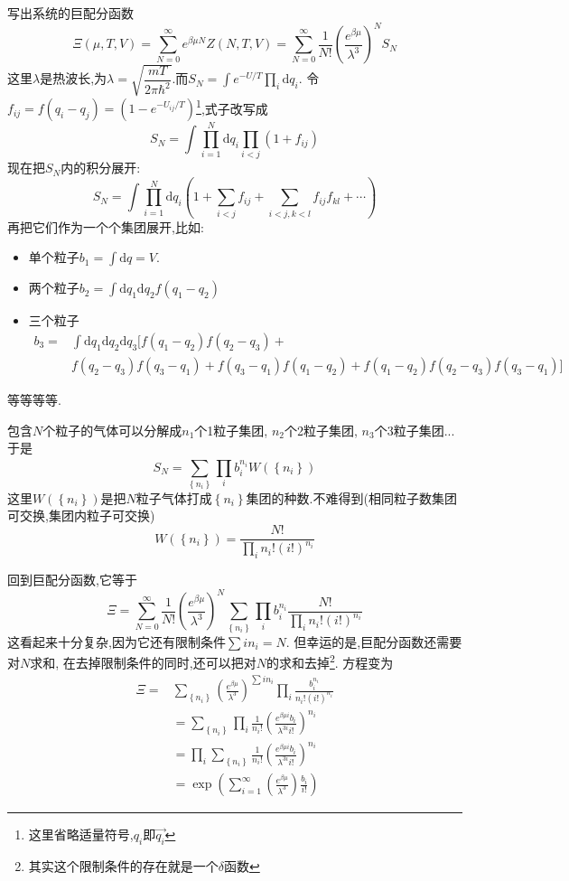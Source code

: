   写出系统的巨配分函数
  \begin{equation}
    \Xi (\mu,T,V)=\sum_{N=0}^{\infty} e^{\beta \mu N} Z(N,T,V)=\sum_{N=0}^{\infty} \frac{1}{N!} \left( \frac{e^{\beta\mu}}{\lambda^{3}} \right) ^{N} S_{N}
  \end{equation}
  这里$\lambda$是热波长,为$\lambda=\sqrt{\dfrac{mT}{2 \pi \hbar^{2}}}$.而$S_{N}=\int e^{-U /T}  \prod_{i}^{ } \mathrm{d}q_{i}$. 令 $f_{ij}= f(q_i -q_{j})=(1-e ^{- U_{ij} /T})$\footnote{这里省略适量符号,$q_{i}$即$\vec{q_{i}}$},式子改写成
  \[S_{N}=\int \prod_{i=1}^{N} \mathrm{d}  q_i  \prod_{i<j}^{} (1+f_{ij})\]
  现在把$S_{N}$内的积分展开:
  \[S_{N}=\int \prod_{i=1}^{N} \mathrm{d}  q_{i} \left( 1+ \sum_{i<j} f_{ij} +\sum_{i<j,k<l} f_{ij}f_{kl}+ \cdots  \right) \]
  再把它们作为一个个集团展开,比如:
  \begin{itemize}
      \item 单个粒子$b_1=\int \mathrm{d} q =V$.
      \item 两个粒子$b_2=\int \mathrm{d} q_1 \mathrm{d} q_2 f(q_1-q_2)$
      \item 三个粒子
        \begin{align*}
         b_3=&\int \mathrm{d} q_1 \mathrm{d} q_2 \mathrm{d} q_3  [f(q_1-q_2)f(q_2-q_3)+\\ &f(q_2-q_3)f(q_3-q_1)+f(q_3-q_1)f(q_1-q_2)+f(q_1-q_2)f(q_2-q_3)f(q_3-q_1) ]
        \end{align*}

  \end{itemize}
  等等等等.

  包含$N$个粒子的气体可以分解成$n_1$个1粒子集团, $n_2$个2粒子集团, $n_3$个3粒子集团... 于是 
  \[S_{N}=\sum_{\left\{ n_{i} \right\} }\prod_{i}^{} b_{i}^{n_{i}}W(\left\{ n_{i} \right\} )\] 
  这里$W(\left\{ n_{i} \right\} )$是把$N$粒子气体打成$\left\{ n_{i} \right\} $集团的种数.不难得到(相同粒子数集团可交换,集团内粒子可交换)
  \[W(\left\{ n_{i} \right\} )=\frac{N!}{\prod_{i}^{} n_{i}!(i!)^{n_{i}}  }\]

  回到巨配分函数,它等于
  \[\Xi=\sum_{N=0}^{\infty}\frac{1}{N!}\left( \frac{e^{\beta \mu}}{\lambda^{3}} \right) ^{N}\sum_{\left\{ n_{i} \right\} } \prod_{i}^{} b_{i}^{n_{i}} \frac{N!}{\prod_{i}^{} n_{i}! (i!)^{n_{i}}}\]
  这看起来十分复杂,因为它还有限制条件$\sum i n_{i}=N$. 但幸运的是,巨配分函数还需要对$N$求和, 在去掉限制条件的同时,还可以把对$N$的求和去掉\footnote{其实这个限制条件的存在就是一个$\delta$函数}. 方程变为
  \begin{align*}
   \Xi= &\sum_{\left\{ n_{i} \right\} }\left( \frac{e^{\beta \mu}}{\lambda^{3}} \right) ^{\sum i n_{i}} \prod_{i}^{} \frac{b_{i}^{n_{i}}}{n_{i}! (i!)^{n_{i}} }\\\
   &=\sum_{\left\{ n_{i} \right\} } \prod_{i}^{} \frac{1}{n_{i}!}\left( \frac{e^{\beta \mu i}b_{i}}{\lambda ^{3i}i!} \right) ^{n_{i}}\\
   &=\prod_{i}^{} \sum_{\left\{ n_{i} \right\} } \frac{1}{n_{i}!}\left( \frac{e^{\beta \mu i}b_{i}}{\lambda ^{3i}i!} \right) ^{n_{i}}\\
   &=\exp(\sum_{i=1}^{\infty} \left( \frac{e^{\beta \mu}}{\lambda^{3}} \right) \frac{b_{i}}{i!})
  \end{align*}
  
